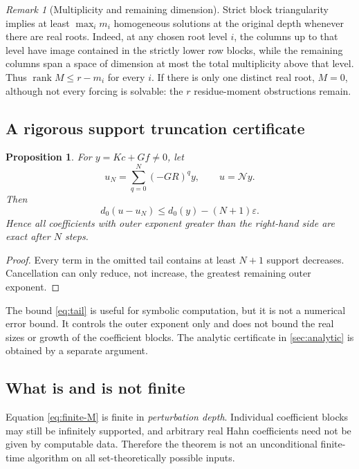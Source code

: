 \documentclass[11pt,a4paper]{article}
\numberwithin{equation}{section}
\newtheorem{proposition}[proposition]{Proposition}
\theoremstyle{definition}
\theoremstyle{remark}
\newtheorem{remark}[remark]{Remark}
\newcommand{\rank}{\operatorname{rank}}
\newcommand{\dprim}{d_0}
\newcommand{\eps}{\varepsilon}
\newcommand{\shift}{\mathcal N}
\begin{document}
\begin{remark}[Multiplicity and remaining dimension]
Strict block triangularity implies at least $\max_i m_i$ homogeneous solutions at the original depth whenever there are real roots. Indeed, at any chosen root level $i$, the columns up to that level have image contained in the strictly lower row blocks, while the remaining columns span a space of dimension at most the total multiplicity above that level. Thus $\rank M\le r-m_i$ for every $i$. If there is only one distinct real root, $M=0$, although not every forcing is solvable: the $r$ residue-moment obstructions remain.
\end{remark}

\subsection{A rigorous support truncation certificate}
\begin{proposition}
\label{prop:tail}
For $y=Kc+Gf\ne0$, let
\[
 u_N=\sum_{q=0}^{N}(-GR)^q y,
 \qquad u=\shift y.
\]
Then
\begin{equation}
 \dprim(u-u_N)\le\dprim(y)-(N+1)\eps.
 \label{eq:tail}
\end{equation}
Hence all coefficients with outer exponent greater than the right-hand side are exact after $N$ steps.
\end{proposition}
\begin{proof}
Every term in the omitted tail contains at least $N+1$ support decreases. Cancellation can only reduce, not increase, the greatest remaining outer exponent.
\end{proof}

The bound \eqref{eq:tail} is useful for symbolic computation, but it is not a numerical error bound. It controls the outer exponent only and does not bound the real sizes or growth of the coefficient blocks. The analytic certificate in \cref{sec:analytic} is obtained by a separate argument.

\subsection{What is and is not finite}
Equation \eqref{eq:finite-M} is finite in \emph{perturbation depth}. Individual coefficient blocks may still be infinitely supported, and arbitrary real Hahn coefficients need not be given by computable data. Therefore the theorem is not an unconditional finite-time algorithm on all set-theoretically possible inputs.
\end{document}
